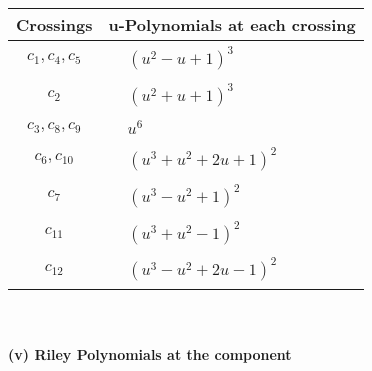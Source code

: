 \documentclass[1p]{elsarticle_modified}
\theoremstyle{definition}
\begin{document}
\begin{tabular}{m{50pt}|m{274pt}}
Crossings & \hspace{64pt}u-Polynomials at each crossing \\
\hline $$\begin{aligned}c_{1},c_{4},c_{5}\end{aligned}$$&$\begin{aligned}
&(u^2- u+1)^3
\end{aligned}$\\
\hline $$\begin{aligned}c_{2}\end{aligned}$$&$\begin{aligned}
&(u^2+u+1)^3
\end{aligned}$\\
\hline $$\begin{aligned}c_{3},c_{8},c_{9}\end{aligned}$$&$\begin{aligned}
&u^6
\end{aligned}$\\
\hline $$\begin{aligned}c_{6},c_{10}\end{aligned}$$&$\begin{aligned}
&(u^3+u^2+2 u+1)^2
\end{aligned}$\\
\hline $$\begin{aligned}c_{7}\end{aligned}$$&$\begin{aligned}
&(u^3- u^2+1)^2
\end{aligned}$\\
\hline $$\begin{aligned}c_{11}\end{aligned}$$&$\begin{aligned}
&(u^3+u^2-1)^2
\end{aligned}$\\
\hline $$\begin{aligned}c_{12}\end{aligned}$$&$\begin{aligned}
&(u^3- u^2+2 u-1)^2
\end{aligned}$\\
\hline
\end{tabular}\\~\\
\newpage\renewcommand{\arraystretch}{1}
\flushleft \textbf{(v) Riley Polynomials at the component}\newline \\
\end{document}
